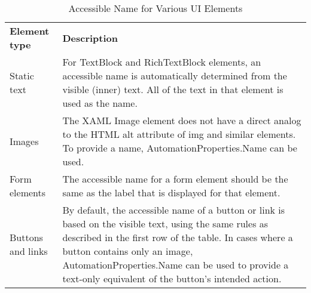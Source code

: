 \begin{table}[htbp]
  \centering
  \caption{Accessible Name for Various UI Elements}
    \label{tab:accessibleNameWP8}%
    \renewcommand{\arraystretch}{1.2}
    \begin{tabularx}{\textwidth}{l|X}
    \rowcolor{mygray}
    \textbf{Element type} & \textbf{Description} \\
    Static text & For TextBlock and RichTextBlock elements, an accessible name is automatically determined from the visible (inner) text. All of the text in that element is used as the name. \\ \hline
    Images & The XAML Image element does not have a direct analog to the HTML alt attribute of img and similar elements. To provide a name, AutomationProperties.Name can be used. \\ \hline
    Form elements & The accessible name for a form element should be the same as the label that is displayed for that element.\\ \hline
    Buttons and links & By default, the accessible name of a button or link is based on the visible text, using the same rules as described in the first row of the table. In cases where a button contains only an image, AutomationProperties.Name can be used to provide a text-only equivalent of the button's intended action. \\
    \end{tabularx}%
\end{table}%
